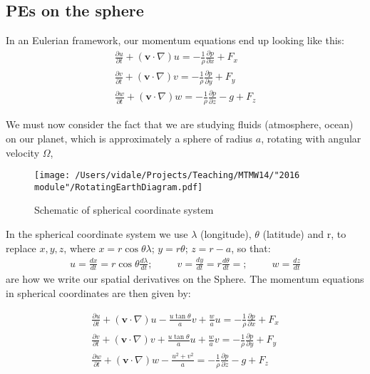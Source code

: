 \subsection{PEs on the sphere}
In an Eulerian framework, our momentum equations end up looking like this:
\begin{eqnarray}
	\frac {\partial u}{\partial t} + \left(\mathbf{v}\cdot\nabla\right)u=-\frac{1}{\rho} \frac{\partial p}{\partial x}+F_x \\
	\frac {\partial v}{\partial t} + \left(\mathbf{v}\cdot\nabla\right)v=-\frac{1}{\rho} \frac{\partial p}{\partial y}+F_y \\
	\frac {\partial w}{\partial t} + \left(\mathbf{v}\cdot\nabla\right)w=-\frac{1}{\rho} \frac{\partial p}{\partial z}-g+F_z
\end{eqnarray}

We must now consider the fact that we are studying fluids (atmosphere, ocean) on our planet, which is approximately a sphere of radius $a$, rotating with angular velocity $\Omega$,

\begin{figure}[h!]
	\begin{center}
		\texttt{[image: /Users/vidale/Projects/Teaching/MTMW14/"2016 module"/RotatingEarthDiagram.pdf]}
		\label{fig:Spherical}
	\end{center}
	\caption{Schematic of spherical coordinate system}
\end{figure}

	In the spherical coordinate system we use $\lambda$ (longitude), $\theta$ (latitude) and r, to replace $x,y,z$, where $x=r \cos{\theta} \lambda$; $y=r\theta$; $z=r-a$, so that:
	\begin{eqnarray}
		u=\frac {dx}{dt}=r \cos{\theta} \frac {d \lambda}{d t} ; ~~~~~~~~~~~ v=\frac {dy}{dt}= r\frac {d\theta}{dt}= ; ~~~~~~~~~~~ w=\frac {dz }{dt }
	\end{eqnarray}
	are how we write our spatial derivatives on the Sphere.	 The momentum equations in spherical coordinates are then given by:

\begin{eqnarray}
	\frac {\partial u}{\partial t} + \left(\mathbf{v}\cdot\nabla\right)u - \frac{u \tan \theta}{a} v  + \frac{w}{a}u =-\frac{1}{\rho} \frac{\partial p}{\partial x}+F_x \\
	\frac {\partial v}{\partial t} + \left(\mathbf{v}\cdot\nabla\right)v + \frac{u \tan \theta}{a} u  + \frac{w}{a}v =-\frac{1}{\rho} \frac{\partial p}{\partial y}+F_y \\
	\frac {\partial w}{\partial t} + \left(\mathbf{v}\cdot\nabla\right)w - \frac{u^2 + v^2}{a} =-\frac{1}{\rho} \frac{\partial p}{\partial z}-g+F_z
\end{eqnarray}


